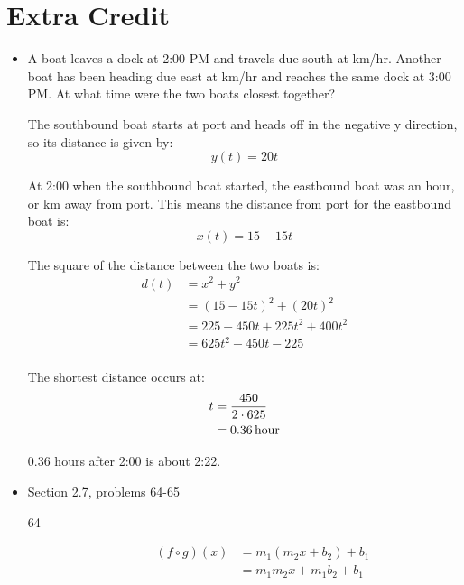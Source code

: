 \documentclass{exam}
\begin{document}
\section{Extra Credit}
\begin{itemize}
  \item A boat leaves a dock at 2:00 PM and travels due south at \unit[20]{km/hr}.  Another boat has been heading due
    east at \unit[15]{km/hr} and reaches the same dock at 3:00 PM.  At what time were the two boats closest together?

    \begin{solution}
      The southbound boat starts at port and heads off in the negative y direction, so its distance is given by:
      \[
        y(t) = 20t
      \]

      At 2:00 when the southbound boat started, the eastbound boat was an hour, or \unit[15]{km} away from port.  This
      means the distance from port for the eastbound boat is:
      \[
        x(t) = 15 - 15t
      \]

      The square of the distance between the two boats is:
      \begin{align*}
        d(t) &= x^2 + y^2 \\
             &= (15 - 15t)^2 + (20t)^2 \\
             &= 225 - 450t + 225t^2 + 400t^2 \\
             &= 625t^2 - 450t - 225 \\
      \end{align*}

      The shortest distance occurs at:
      \begin{align*}
        t &= \frac{450}{2 \cdot 625} \\
          &= \unit[0.36]{hour} \\
      \end{align*}

      0.36 hours after 2:00 is about 2:22.

    \end{solution}

  \ifprintanswers
    \pagebreak
  \fi

  \item Section 2.7, problems 64-65
    \begin{solution}
      \begin{description}

        \item[64]
          \begin{align*}
            (f \circ g)(x) &= m_1 (m_2x + b_2) + b_1 \\
              &= m_1m_2x + m_1b_2 + b_1 \\
          \end{align*}


\end{description}
\end{solution}
\end{itemize}
\end{document}
